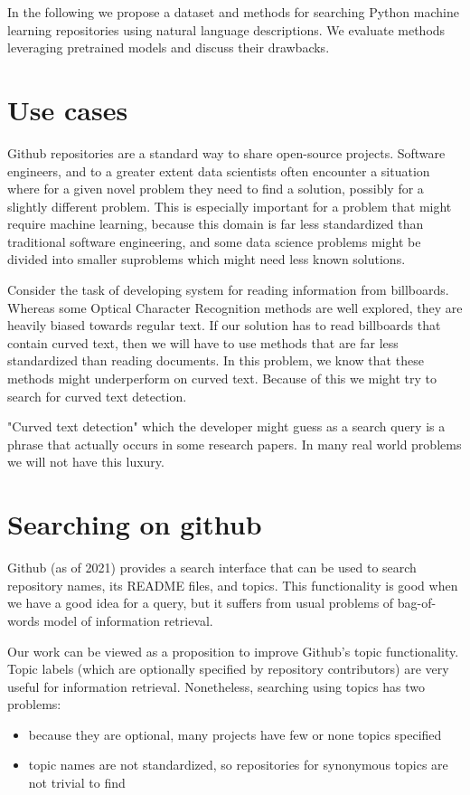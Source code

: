 \documentclass[longabstract,mgr,english]{iithesis}
\begin{document}
In the following we propose a dataset and methods for searching Python machine learning repositories using natural language descriptions. We evaluate methods leveraging pretrained models and discuss their drawbacks.

\section{Use cases}


Github repositories are a standard way to share open-source projects.
Software engineers, and to a greater extent data scientists often encounter a situation where for a given novel problem they need to find a solution, possibly for a slightly different problem.
This is especially important for a problem that might require machine learning, because this domain is far less standardized than traditional software engineering, and some data science problems might be divided into smaller suproblems which might need less known solutions.

Consider the task of developing system for reading information from billboards.
Whereas some Optical Character Recognition methods are well explored, they are heavily biased towards regular text.
If our solution has to read billboards that contain curved text, then we will have to use methods that are far less standardized than reading documents.
In this problem, we know that these methods might underperform on curved text. Because of this we might try to search for curved text detection.

"Curved text detection" which the developer might guess as a search query is a phrase that actually occurs in some research papers. In many real world problems we will not have this luxury.

\section{Searching on github}
\label{intro_searching_github}

Github (as of 2021) provides a search interface that can be used to search repository names, its README files, and topics.
This functionality is good when we have a good idea for a query, but it suffers from usual problems of bag-of-words model of information retrieval.

Our work can be viewed as a proposition to improve Github's topic functionality. Topic labels (which are optionally specified by repository contributors) are very useful for information retrieval.
Nonetheless, searching using topics has two problems:
\begin{itemize}
\item because they are optional, many projects have few or none topics specified
\item topic names are not standardized, so repositories for synonymous topics are not trivial to find
\end{itemize}
\end{document}

